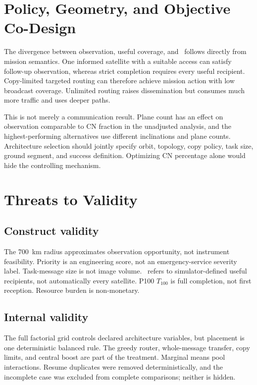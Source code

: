 \section{Policy, Geometry, and Objective Co-Design}

The divergence between observation, useful coverage, and \Suseful\ follows directly from mission semantics. One informed satellite with a suitable access can satisfy follow-up observation, whereas strict completion requires every useful recipient. Copy-limited targeted routing can therefore achieve mission action with low broadcast coverage. Unlimited routing raises dissemination but consumes much more traffic and uses deeper paths.

This is not merely a communication result. Plane count has an effect on observation comparable to CN fraction in the unadjusted analysis, and the highest-performing alternatives use different inclinations and plane counts. Architecture selection should jointly specify orbit, topology, copy policy, task size, ground segment, and success definition. Optimizing CN percentage alone would hide the controlling mechanism.

\section{Threats to Validity}

\subsection{Construct validity}

The \SI{700}{\kilo\metre} radius approximates observation opportunity, not instrument feasibility. Priority is an engineering score, not an emergency-service severity label. Task-message size is not image volume. \Suseful\ refers to simulator-defined useful recipients, not automatically every satellite. P100 $T_{100}$ is full completion, not first reception. Resource burden is non-monetary.

\subsection{Internal validity}

The full factorial grid controls declared architecture variables, but placement is one deterministic balanced rule. The greedy router, whole-message transfer, copy limits, and central boost are part of the treatment. Marginal means pool interactions. Resume duplicates were removed deterministically, and the incomplete case was excluded from complete comparisons; neither is hidden.

